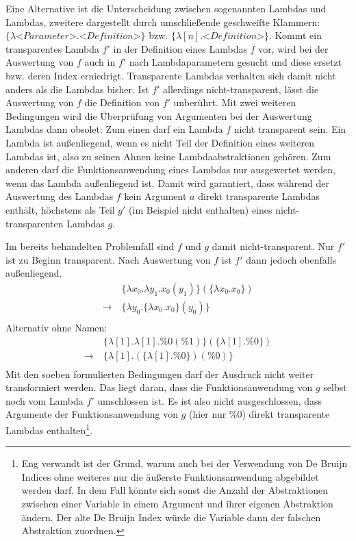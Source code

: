  Eine Alternative ist die Unterscheidung zwischen sogenannten  Lambdas und  Lambdas, zweitere dargestellt durch umschließende geschweifte Klammern: $\{\lambda \textit{<Parameter>}.\textit{<Definition>}\}$ bzw. $\{\lambda [n].\textit{<Definition>}\}$. Kommt ein transparentes Lambda $f'$ in der Definition eines Lambdas $f$ vor, wird bei der Auswertung von $f$ auch in $f'$ nach Lambdaparametern gesucht und diese ersetzt bzw. deren Index erniedrigt. Transparente Lambdas verhalten sich damit nicht anders als die Lambdas bisher. Ist $f'$ allerdings nicht-transparent, lässt die Auswertung von $f$ die Definition von $f'$ unberührt. 
 Mit zwei weiteren Bedingungen wird die Überprüfung von Argumenten bei der Auswertung Lambdas dann obsolet: 
 Zum einen darf ein  Lambda $f$ nicht transparent sein. Ein Lambda ist außenliegend, wenn es nicht Teil der Definition eines weiteren Lambdas ist, also zu seinen Ahnen keine Lambdaabstraktionen gehören. Zum anderen darf die Funktionsanwendung eines Lambdas nur ausgewertet werden, wenn das Lambda außenliegend ist. Damit wird garantiert, dass während der Auswertung des Lambdas $f$ kein Argument $a$ direkt transparente Lambdas enthält, höchstens als Teil $g'$ (im Beispiel nicht enthalten) eines nicht-transparenten Lambdas $g$.

Im bereits behandelten Problemfall sind $f$ und $g$ damit nicht-transparent. Nur $f'$ ist zu Beginn transparent. Nach Auswertung von $f$ ist $f'$ dann jedoch ebenfalls außenliegend.
\begin{align*}
    ~           &~\{\lambda x_0 .\lambda y_1 .x_0(y_1)\}(\{\lambda x_0 .x_0\}) \\
    \rightarrow &~\{\lambda y_0 .\{\lambda x_0 .x_0\}(y_0)\}\\
\end{align*}
Alternativ ohne Namen:
\begin{align*}
    ~           &~\{\lambda [1] .\lambda [1] .\%0(\%1)\}(\{\lambda [1] .\%0\}) \\
    \rightarrow &~\{\lambda [1] .(\{\lambda [1] .\%0\})(\%0)\}\\
\end{align*}
Mit den soeben formulierten Bedingungen darf der Ausdruck nicht weiter transformiert werden. Das liegt daran, dass die Funktionsanwendung von $g$ selbst noch vom Lambda $f'$ umschlossen ist. Es ist also nicht ausgeschlossen, dass Argumente der Funktionsanwendung von $g$ (hier nur $\%0$) direkt transparente Lambdas enthalten\footnote{Eng verwandt ist der Grund, warum auch bei der Verwendung von De Bruijn Indices ohne weiteres nur die äußerste Funktionsanwendung abgebildet werden darf. In dem Fall könnte sich sonst die Anzahl der Abstraktionen zwischen einer Variable in einem Argument und ihrer eigenen Abstraktion ändern. Der alte De Bruijn Index würde die Variable dann der falschen Abstraktion zuordnen.}.




